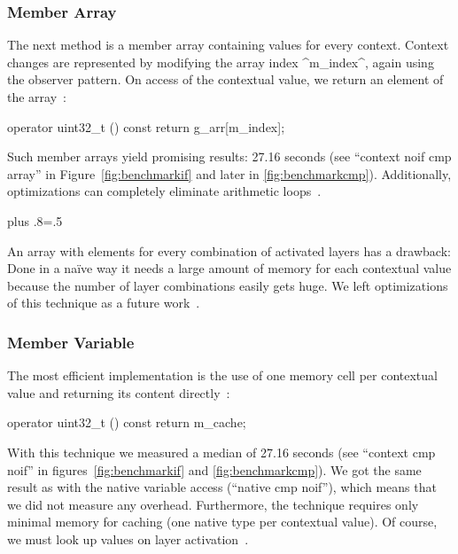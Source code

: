 \subsubsection{Member Array}

The next method is a member array containing values for every context.
Context changes are represented by modifying the array index ^m_index^, again using the observer pattern.
On access of the contextual value, we return an element of the array~\cite{raab2014program}:

\begin{code}[language=Cpp]
operator uint32_t () const
{
	return g_arr[m_index];
}
\end{code}

Such member arrays yield promising results:
27.16 seconds (see ``context noif cmp array''  in Figure~\ref{fig:benchmarkif} and later in \ref{fig:benchmarkcmp}).
Additionally, optimizations can completely eliminate arithmetic loops~\cite{raab2014program}.%
{\parfillskip=0pt plus .8\textwidth \emergencystretch=.5\textwidth \par}

An array with elements for every combination of activated layers has a drawback:
Done in a na\"{i}ve way it needs a large amount of memory for each contextual value because the number of layer combinations easily gets huge.
We left optimizations of this technique as a future work~\cite{raab2014program}.

\subsubsection{Member Variable}

The most efficient implementation is the use of one memory cell per contextual value and returning its content directly~\cite{raab2014program}:

\begin{code}[language=Cpp]
operator uint32_t () const
{
	return m_cache;
}
\end{code}

With this technique we measured a median of 27.16 seconds (see ``context cmp noif'' in figures~\ref{fig:benchmarkif} and \ref{fig:benchmarkcmp}).
We got the same result as with the native variable access (``native cmp noif''), which means that we did not measure any overhead.
Furthermore, the technique requires only minimal memory for caching (one native type per contextual value).
Of course, we must look up values on layer activation~\cite{raab2014program}.

